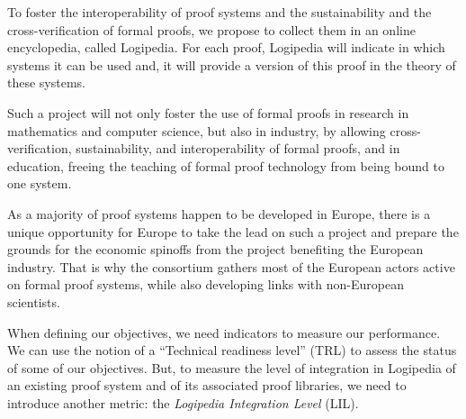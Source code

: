 To foster the interoperability of proof systems and the sustainability
and the cross-verification of formal proofs, we propose to collect
them in an online encyclopedia, called Logipedia.  For each proof,
Logipedia will indicate in which systems it can be used and, it will
provide a version of this proof in the theory of these systems.

Such a project will not only foster the use of formal proofs in
research in mathematics and computer science, but also in industry, by
allowing cross-verification, sustainability, and interoperability of
formal proofs, and in education, freeing the teaching of formal proof
technology from being bound to one system.

As a
majority of proof systems happen to be developed in Europe, there is a unique
opportunity for Europe to take the lead on such a project and prepare
the grounds for the economic spinoffs from the project benefiting
the European industry. That is why the consortium gathers most of the
European actors active on formal proof systems, while also developing
links with non-European scientists.

When defining our objectives, we need indicators to measure our
performance.  We can use the notion of a ``Technical readiness level''
(TRL) to assess the status of some of our objectives.  But, to measure
the level of integration in Logipedia of an existing proof system and
of its associated proof libraries, we need to introduce another
metric: the {\em Logipedia Integration Level} (LIL).


